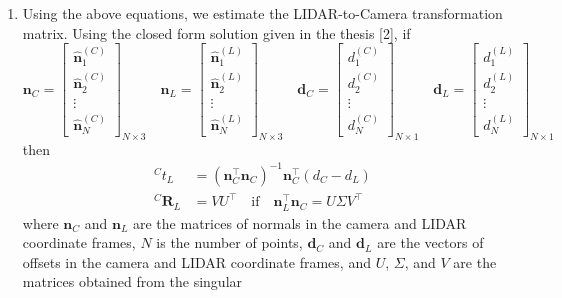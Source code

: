 \documentclass[10pt]{article}
\begin{document}
\begin{enumerate}
        \item Using the above equations, we estimate the LIDAR-to-Camera transformation
        matrix. Using the closed form solution given in the thesis [2], if
        \begin{equation*}
            \mathbf{n}_{C} = \begin{bmatrix}
                \hat{\mathbf{n}}_{1}^{(C)} \\ \hat{\mathbf{n}}_{2}^{(C)} \\ \vdots \\ \hat{\mathbf{n}}_{N}^{(C)}
            \end{bmatrix}_{N \times 3} \quad
            \mathbf{n}_{L} = \begin{bmatrix}
                \hat{\mathbf{n}}_{1}^{(L)} \\ \hat{\mathbf{n}}_{2}^{(L)} \\ \vdots \\ \hat{\mathbf{n}}_{N}^{(L)}
            \end{bmatrix}_{N \times 3} \quad
            \mathbf{d}_{C} = \begin{bmatrix}
                d_{1}^{(C)} \\ d_{2}^{(C)} \\ \vdots \\ d_{N}^{(C)}
            \end{bmatrix}_{N \times 1} \quad
            \mathbf{d}_{L} = \begin{bmatrix}
                d_{1}^{(L)} \\ d_{2}^{(L)} \\ \vdots \\ d_{N}^{(L)}
            \end{bmatrix}_{N \times 1}
        \end{equation*}
        then
        \begin{align*}
            ^{C} t_{L} &= (\mathbf{n}_{C}^{\top} \mathbf{n}_{C})^{-1} \mathbf{n}_{C}^{\top} (d_{C} - d_{L}) \\
            ^{C} \mathbf{R}_{L} &= V U^{\top} \quad \text{if} \quad
            \mathbf{n}_{L}^{\top} \mathbf{n}_{C} = U \Sigma V^{\top}
        \end{align*}
        where $\mathbf{n}_{C}$ and $\mathbf{n}_{L}$ are the matrices of normals in the
        camera and LIDAR coordinate frames, $N$ is the number of points, $\mathbf{d}_{C}$
        and $\mathbf{d}_{L}$ are the vectors of offsets in the camera and LIDAR coordinate
        frames, and $U$, $\Sigma$, and $V$ are the matrices obtained from the singular

\end{enumerate}
\end{document}
